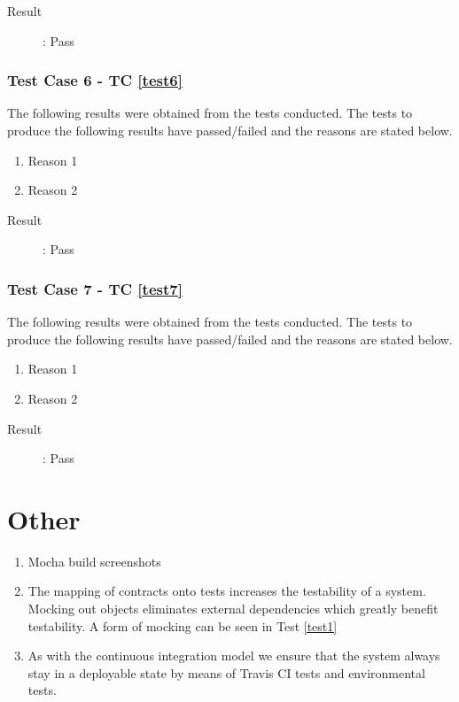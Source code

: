\documentclass{article}
\begin{document}
\begin{description}
	\item [Result]: Pass 
\end{description}

\subsubsection{Test Case 6 - TC \ref{test6}}
The following results were obtained from the tests conducted. The tests to produce the
following results have passed/failed and the reasons are stated below.
\begin{enumerate}
	\item Reason 1
	\item Reason 2
\end{enumerate}

\begin{description}
	\item [Result]: Pass 
\end{description}

\subsubsection{Test Case 7 - TC \ref{test7}}
The following results were obtained from the tests conducted. The tests to produce the
following results have passed/failed and the reasons are stated below.
\begin{enumerate}
	\item Reason 1
	\item Reason 2
\end{enumerate}

\begin{description}
	\item [Result]: Pass 
\end{description}

\section{Other}
\begin{enumerate}
	\item Mocha build screenshots %
	\item The mapping of contracts onto tests increases the testability of a system. Mocking out objects eliminates external dependencies which greatly benefit testability. A form of mocking can be seen in Test \ref{test1}
	\item As with the continuous integration model we ensure that the system always stay in a deployable state by means of Travis CI tests and environmental tests.
\end{enumerate}
\end{document}
